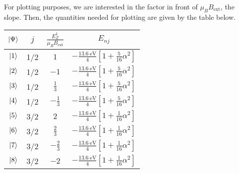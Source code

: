 \documentclass[a4paper, 12pt]{config/homework}
\begin{document}
\begin{enumerate}
\pagebreak
For plotting purposes, we are interested in the factor in front of \(\mu_B B_\text{ext}\), the slope. Then, the quantities needed for plotting are given by the table below.
\begin{table}[h]
\centering
\begin{tabular}{c|ccc}
\(\ket*{\Psi}\) & \(j\) & \(\frac{E_Z^1}{\mu_B B_\text{ext}}\) & \(E_{nj}\)                                                        \\ \hline
\(\ket*{1}\) & 1/2 & \(1\) & \(-\frac{\qty{13.6}{\eV}}{4}\left[1+\frac{5}{16}\alpha^2\right]\) \\
\(\ket*{2}\) & 1/2 & \(-1\) & \(-\frac{\qty{13.6}{\eV}}{4}\left[1+\frac{5}{16}\alpha^2\right]\) \\
\(\ket*{3}\) & 1/2 & \(\frac{1}{3}\) & \(-\frac{\qty{13.6}{\eV}}{4}\left[1+\frac{5}{16}\alpha^2\right]\) \\
\(\ket*{4}\) & 1/2 & \(-\frac{1}{3}\) & \(-\frac{\qty{13.6}{\eV}}{4}\left[1+\frac{5}{16}\alpha^2\right]\) \\
\(\ket*{5}\) & 3/2 & \(2\) & \(-\frac{\qty{13.6}{\eV}}{4}\left[1+\frac{1}{16}\alpha^2\right]\) \\
\(\ket*{6}\) & 3/2 & \(\frac{2}{3}\) & \(-\frac{\qty{13.6}{\eV}}{4}\left[1+\frac{1}{16}\alpha^2\right]\) \\
\(\ket*{7}\) & 3/2 & \(-\frac{2}{3}\) & \(-\frac{\qty{13.6}{\eV}}{4}\left[1+\frac{1}{16}\alpha^2\right]\) \\
\(\ket*{8}\) & 3/2 & \(-2\) & \(-\frac{\qty{13.6}{\eV}}{4}\left[1+\frac{1}{16}\alpha^2\right]\)
\end{tabular}
\end{table}

\end{enumerate}
\end{document}
